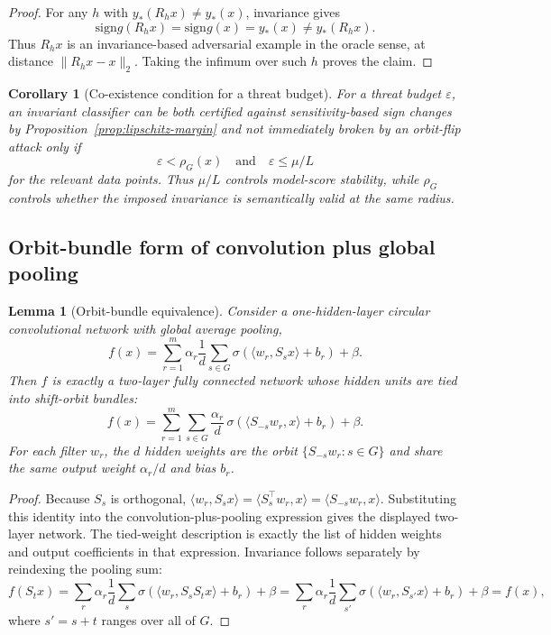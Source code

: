 \documentclass[11pt]{article}
\theoremstyle{plain}
\newtheorem{lemma}{Lemma}
\newtheorem{corollary}{Corollary}
\theoremstyle{definition}
\theoremstyle{remark}
\newcommand{\sign}{\mathrm{sign}}
\begin{document}
\begin{proof}
For any $h$ with $y_*(R_hx)\ne y_*(x)$, invariance gives
\[
\sign g(R_hx)=\sign g(x)=y_*(x)\ne y_*(R_hx).
\]
Thus $R_hx$ is an invariance-based adversarial example in the oracle sense, at distance $\|R_hx-x\|_2$.  Taking the infimum over such $h$ proves the claim.
\end{proof}

\begin{corollary}[Co-existence condition for a threat budget]
For a threat budget $\varepsilon$, an invariant classifier can be both certified against sensitivity-based sign changes by Proposition~\ref{prop:lipschitz-margin} and not immediately broken by an orbit-flip attack only if
\[
\varepsilon < \rho_G(x)\quad\text{and}\quad \varepsilon\le \mu/L
\]
for the relevant data points.  Thus $\mu/L$ controls model-score stability, while $\rho_G$ controls whether the imposed invariance is semantically valid at the same radius.
\end{corollary}

\subsection{Orbit-bundle form of convolution plus global pooling}\label{sec:bundle}

\begin{lemma}[Orbit-bundle equivalence]\label{lem:bundle-corrected}
Consider a one-hidden-layer circular convolutional network with global average pooling,
\[
f(x)=\sum_{r=1}^m \alpha_r\frac1d\sum_{s\in G}\sigma(\langle w_r,S_sx\rangle+b_r)+\beta.
\]
Then $f$ is exactly a two-layer fully connected network whose hidden units are tied into shift-orbit bundles:
\[
f(x)=\sum_{r=1}^m\sum_{s\in G}\frac{\alpha_r}{d}\,\sigma(\langle S_{-s}w_r,x\rangle+b_r)+\beta.
\]
For each filter $w_r$, the $d$ hidden weights are the orbit $\{S_{-s}w_r:s\in G\}$ and share the same output weight $\alpha_r/d$ and bias $b_r$.
\end{lemma}

\begin{proof}
Because $S_s$ is orthogonal, $\langle w_r,S_sx\rangle=\langle S_s^\top w_r,x\rangle=\langle S_{-s}w_r,x\rangle$.  Substituting this identity into the convolution-plus-pooling expression gives the displayed two-layer network.  The tied-weight description is exactly the list of hidden weights and output coefficients in that expression.  Invariance follows separately by reindexing the pooling sum:
\[
f(S_tx)=\sum_r\alpha_r\frac1d\sum_s\sigma(\langle w_r,S_sS_tx\rangle+b_r)+\beta
=\sum_r\alpha_r\frac1d\sum_{s'}\sigma(\langle w_r,S_{s'}x\rangle+b_r)+\beta=f(x),
\]
where $s'=s+t$ ranges over all of $G$.
\end{proof}
\end{document}
